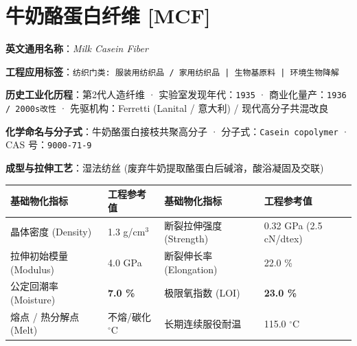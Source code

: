 \documentclass[11pt,openright,twoside,UTF8]{ctexbook}
\begin{document}
\section{牛奶酪蛋白纤维 [MCF]}
\label{sec:mcf}

\noindent\textbf{英文通用名称}：\textit{Milk Casein Fiber}\par
\noindent\textbf{工程应用标签}：\texttt{纺织门类: 服装用纺织品 / 家用纺织品 | 生物基原料 | 环境生物降解}\par
\noindent\textbf{历史工业化历程}：第2代人造纤维 · 实验室发现年代：\texttt{1935} · 商业化量产：\texttt{1936 / 2000s改性} · 先驱机构：Ferretti (Lanital / 意大利) / 现代高分子共混改良\par
\noindent\textbf{化学命名与分子式}：牛奶酪蛋白接枝共聚高分子 · 分子式：\texttt{Casein copolymer} · CAS 号：\texttt{9000-71-9}\par
\noindent\textbf{成型与拉伸工艺}：湿法纺丝 (废弃牛奶提取酪蛋白后碱溶，酸浴凝固及交联)\par

\vspace{0.15cm}
\begin{center}
\small
\begin{tabularx}{\textwidth}{p{3.8cm}Xp{3.8cm}X}
\toprule
\textbf{基础物化指标} & \textbf{工程参考值} & \textbf{基础物化指标} & \textbf{工程参考值} \\
\midrule
晶体密度 (Density) & 1.3 g/cm$^3$ & 断裂拉伸强度 (Strength) & 0.32 GPa (2.5 cN/dtex) \\
拉伸初始模量 (Modulus) & 4.0 GPa & 断裂伸长率 (Elongation) & 22.0 \% \\
公定回潮率 (Moisture) & \textbf{7.0 \%} & 极限氧指数 (LOI) & \textbf{23.0 \%} \\
熔点 / 热分解点 (Melt) & 不熔/碳化 $^\circ\mathrm{C}$ & 长期连续服役耐温 & 115.0 $^\circ\mathrm{C}$ \\
\bottomrule
\end{tabularx}
\end{center}
\vspace{0.15cm}
\end{document}

